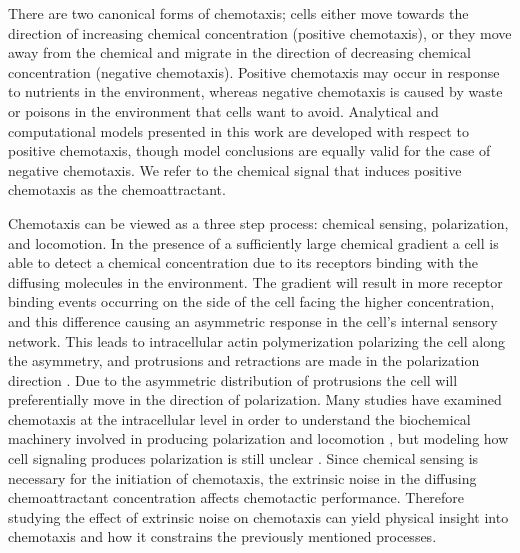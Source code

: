 There are two canonical forms of chemotaxis; cells either move towards the direction of increasing chemical concentration (positive chemotaxis), or they move away from the chemical and migrate in the direction of decreasing chemical concentration (negative chemotaxis). Positive chemotaxis may occur in response to nutrients in the environment, whereas negative chemotaxis is caused by waste or poisons in the environment that cells want to avoid. Analytical and computational models presented in this work are developed with respect to positive chemotaxis, though model conclusions are equally valid for the case of negative chemotaxis. We refer to the chemical signal that induces positive chemotaxis as the chemoattractant.

Chemotaxis can be viewed as a three step process: chemical sensing, polarization, and locomotion. In the presence of a sufficiently large chemical gradient a cell is able to detect a chemical concentration due to its receptors binding with the diffusing molecules in the environment. The gradient will result in more receptor binding events occurring on the side of the cell facing the higher concentration, and this difference causing an asymmetric response in the cell's internal sensory network. This leads to intracellular actin polymerization polarizing the cell along the asymmetry, and protrusions and retractions are made in the polarization direction \cite{jilkine2011comparison}. Due to the asymmetric distribution of protrusions the cell will preferentially move in the direction of polarization. Many studies have examined chemotaxis at the intracellular level in order to understand the biochemical machinery involved in producing polarization and locomotion \cite{petrie2009random}, but modeling how cell signaling produces polarization is still unclear \cite{iglesias2008navigating}.
Since chemical sensing is necessary for the initiation of chemotaxis, the extrinsic noise in the diffusing chemoattractant concentration affects chemotactic performance. Therefore studying the effect of extrinsic noise on chemotaxis can yield physical insight into chemotaxis and how it constrains the previously mentioned processes.


